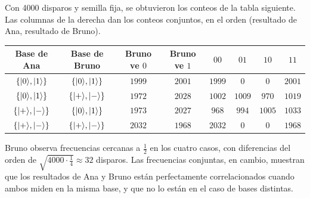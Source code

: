 Con 4000 disparos y semilla fija, se obtuvieron los conteos de la tabla siguiente. Las columnas de la derecha dan los conteos conjuntos, en el orden (resultado de Ana, resultado de Bruno).
\begin{center}
\renewcommand{\arraystretch}{1.3}
\begin{tabular}{cc|cc|cccc}
  Base de Ana & Base de Bruno & Bruno ve $0$ & Bruno ve $1$ & $00$ & $01$ & $10$ & $11$\\\hline
  $\{\lvert 0\rangle,\lvert 1\rangle\}$ & $\{\lvert 0\rangle,\lvert 1\rangle\}$ & $1999$ & $2001$ & $1999$ & $0$ & $0$ & $2001$\\
  $\{\lvert 0\rangle,\lvert 1\rangle\}$ & $\{\lvert +\rangle,\lvert -\rangle\}$ & $1972$ & $2028$ & $1002$ & $1009$ & $970$ & $1019$\\
  $\{\lvert +\rangle,\lvert -\rangle\}$ & $\{\lvert 0\rangle,\lvert 1\rangle\}$ & $1973$ & $2027$ & $968$ & $994$ & $1005$ & $1033$\\
  $\{\lvert +\rangle,\lvert -\rangle\}$ & $\{\lvert +\rangle,\lvert -\rangle\}$ & $2032$ & $1968$ & $2032$ & $0$ & $0$ & $1968$
\end{tabular}
\end{center}
Bruno observa frecuencias cercanas a $\frac12$ en los cuatro casos, con diferencias del orden de $\sqrt{4000\cdot\frac14}\approx32$ disparos. Las frecuencias conjuntas, en cambio, muestran que los resultados de Ana y Bruno están perfectamente correlacionados cuando ambos miden en la misma base, y que no lo están en el caso de bases distintas.
